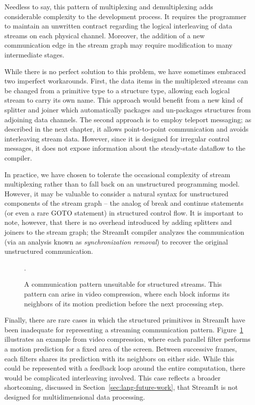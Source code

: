   Needless to say, this pattern of multiplexing and demultiplexing
  adds considerable complexity to the development process.  It
  requires the programmer to maintain an unwritten contract regarding
  the logical interleaving of data streams on each physical channel.
  Moreover, the addition of a new communication edge in the stream
  graph may require modification to many intermediate stages.

  While there is no perfect solution to this problem, we have
  sometimes embraced two imperfect workarounds.  First, the data items
  in the multiplexed streams can be changed from a primitive type to a
  structure type, allowing each logical stream to carry its own name.
  This approach would benefit from a new kind of splitter and joiner
  which automatically packages and un-packages structures from
  adjoining data channels.  The second approach is to employ teleport
  messaging; as described in the next chapter, it allows
  point-to-point communication and avoids interleaving stream data.
  However, since it is designed for irregular control messages, it
  does not expose information about the steady-state dataflow to the
  compiler.

  In practice, we have chosen to tolerate the occasional complexity of
  stream multiplexing rather than to fall back on an unstructured
  programming model.  However, it may be valuable to consider a
  natural syntax for unstructured components of the stream graph --
  the analog of break and continue statements (or even a rare GOTO
  statement) in structured control flow. It is important to note,
  however, that there is no overhead introduced by adding splitters
  and joiners to the stream graph; the StreamIt compiler analyzes the
  communication (via an analysis known as {\it synchronization
  removal}) to recover the original unstructured communication.

\begin{figure}[t]
\centering
{}

\caption[A communication pattern unsuitable for structured streams.]{A
  communication pattern unsuitable for structured streams.  This
  pattern can arise in video compression, where each block informs its
  neighbors of its motion prediction before the next processing
  step.\protect\label{fig:inadequate}}.
\end{figure}

  Finally, there are rare cases in which the structured primitives in
  StreamIt have been inadequate for representing a streaming
  communication pattern.  Figure~\ref{fig:inadequate} illustrates an
  example from video compression, where each parallel filter performs
  a motion prediction for a fixed area of the screen.  Between
  successive frames, each filters shares its prediction with its
  neighbors on either side.  While this could be represented with a
  feedback loop around the entire computation, there would be
  complicated interleaving involved.  This case reflects a broader
  shortcoming, discussed in Section~\ref{sec:lang-future-work}, that
  StreamIt is not designed for multidimensional data processing.

